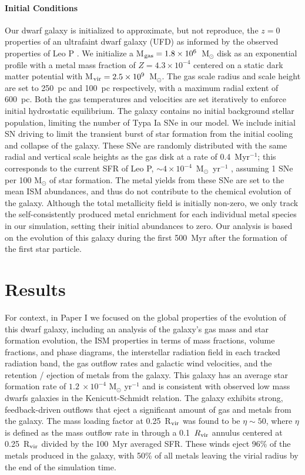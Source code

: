 \paragraph{Initial Conditions} Our dwarf galaxy is initialized to approximate, but not reproduce, the $z = 0$ properties of an ultrafaint dwarf galaxy (UFD) as informed by the observed properties of Leo P \citep[see ][]{Giovanelli2013,McQuinn2015a,McQuinn2015}. We initialize a M$_{\rm gas} = 1.8 \times 10^{6}$~M$_{\odot}$ disk as an exponential profile with a metal mass fraction of $Z = 4.3 \times 10^{-4}$ centered on a static \cite{Burkert1995} dark matter potential with M$_{\rm vir} = 2.5 \times 10^{9}$~M$_{\odot}$. The gas scale radius and scale height are set to 250~pc and 100~pc respectively, with a maximum radial extent of 600~pc. Both the gas temperatures and velocities are set iteratively to enforce initial hydrostatic equilibrium. The galaxy contains no initial background stellar population, limiting the number of Typa Ia SNe in our model. We include initial SN driving to limit the transient burst of star formation from the initial cooling and collapse of the galaxy. These SNe are randomly distributed with the same radial and vertical scale heights as the gas disk at a rate of 0.4~Myr$^{-1}$; this corresponds to the current SFR of Leo P, $\sim 4\times 10^{-4}$~M$_{\odot}$~yr$^{-1}$ \citep{McQuinn2015a}, assuming 1 SNe per 100 M$_{\odot}$ of star formation. The metal yields from these SNe are set to the mean ISM abundances, and thus do not contribute to the chemical evolution of the galaxy. Although the total metallicity field is initially non-zero, we only track the self-consistently produced metal enrichment for each individual metal species in our simulation, setting their initial abundances to zero. Our analysis is based on the evolution of this galaxy during the first 500~Myr after the formation of the first star particle.

\section{Results}
For context, in Paper I we focused on the global properties of the evolution of this dwarf galaxy, including an analysis of the galaxy's gas mass and star formation evolution, the ISM properties in terms of mass fractions, volume fractions, and phase diagrams, the interstellar radiation field in each tracked radiation band, the gas outflow rates and galactic wind velocities, and the retention / ejection of metals from the galaxy. This galaxy has an average star formation rate of $1.2~\times 10^{-4}$ M$_{\odot}$ yr$^{-1}$ and is consistent with observed low mass dwarfs galaxies in the Kenicutt-Schmidt relation.  The galaxy exhibits strong, feedback-driven outflows \citep{Emerick2018b} that eject a significant amount of gas and metals from the galaxy. The mass loading factor at 0.25~R$_{\rm vir}$ was found to be $\eta \sim 50$, where $\eta$ is defined as the mass outflow rate in through a 0.1~$R_{\rm vir}$ annulus centered at 0.25~R$_{\rm vir}$ divided by the 100~Myr averaged SFR. These winds eject 96\% of the metals produced in the galaxy, with 50\% of all metals leaving the virial radius by the end of the simulation time.

